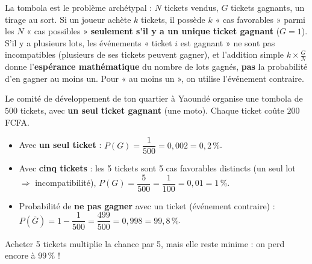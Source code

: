 \documentclass[11pt]{article}
\begin{document}
La tombola est le problème archétypal : $N$ tickets vendus, $G$ tickets gagnants, un tirage au sort. Si un joueur achète $k$ tickets, il possède $k$ « cas favorables » parmi les $N$ « cas possibles » \textbf{seulement s'il y a un unique ticket gagnant} ($G=1$). S'il y a plusieurs lots, les événements « ticket $i$ est gagnant » ne sont pas incompatibles (plusieurs de ses tickets peuvent gagner), et l'addition simple $k \times \frac{G}{N}$ donne l'\textbf{espérance mathématique} du nombre de lots gagnés, \textbf{pas} la probabilité d'en gagner au moins un. Pour « au moins un », on utilise l'événement contraire.

\begin{exemplebox}
Le comité de développement de ton quartier à Yaoundé organise une tombola de $500$ tickets, avec \textbf{un seul ticket gagnant} (une moto). Chaque ticket coûte $200$ FCFA.
\begin{itemize}
\item Avec \textbf{un seul ticket} : $P(G) = \dfrac{1}{500} = 0{,}002 = 0{,}2\,\%$.
\item Avec \textbf{cinq tickets} : les 5 tickets sont 5 cas favorables distincts (un seul lot $\Rightarrow$ incompatibilité), $P(G) = \dfrac{5}{500} = \dfrac{1}{100} = 0{,}01 = 1\,\%$.
\item Probabilité de \textbf{ne pas gagner} avec un ticket (événement contraire) : $P(\overline{G}) = 1 - \dfrac{1}{500} = \dfrac{499}{500} = 0{,}998 = 99{,}8\,\%$.
\end{itemize}
Acheter 5 tickets multiplie la chance par 5, mais elle reste minime : on perd encore à $99\,\%$ !
\end{exemplebox}
\end{document}
